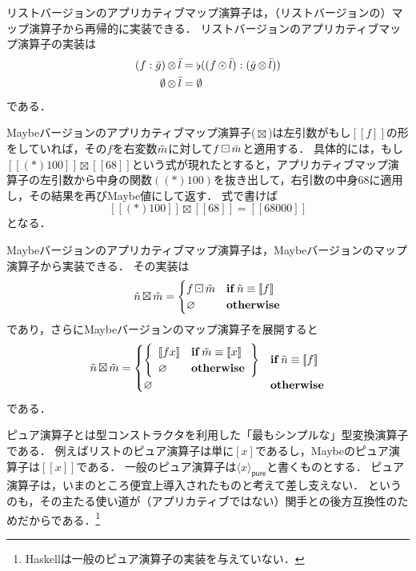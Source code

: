 \documentclass[twocolumn]{jsbook}
\def\[{[\![}
\def\]{]\!]}
\DeclareMathOperator{\hsklApplicativeListMap}{\otimes}
\DeclareMathOperator{\hsklApplicativeMaybeMap}{\boxtimes}
\DeclareMathOperator{\hsklConcat}{\flat}
\DeclareMathOperator{\hsklMap}{\odot}
\DeclareMathOperator{\hsklMaybeMap}{\boxdot}
\newcommand{\hsklEmptyList}{\emptyset}
\newcommand{\hsklNothing}{\varnothing}
\newcommand{\hsklJust}[1]{\[#1\]}
\newcommand{\hsklList}[1]{\Bar{#1}}
\newcommand{\hsklMaybe}[1]{\Tilde{#1}}
\newcommand{\hsklPure}[1]{\langle#1\rangle_\textsf{pure}}
\newcommand{\mathKeyword}[1]{\mathbf{#1}}
\DeclareMathOperator{\mathIf}{\mathKeyword{if}}
\newcommand{\mathOtherwise}{\mathKeyword{otherwise}}
\begin{document}
リストバージョンのアプリカティブマップ演算子は，（リストバージョンの）マップ演算子から再帰的に実装できる．
リストバージョンのアプリカティブマップ演算子の実装は
\begin{align*}
(f:\hsklList{g})\hsklApplicativeListMap\hsklList{l}&=\hsklConcat((f\hsklMap\hsklList{l}):(\hsklList{g}\hsklApplicativeListMap\hsklList{l}))\\
\hsklEmptyList\hsklApplicativeListMap\hsklList{l}&=\hsklEmptyList
\end{align*}
である．

Maybeバージョンのアプリカティブマップ演算子($\hsklApplicativeMaybeMap$)は左引数がもし$\hsklJust{f}$の形をしていれば，その$f$を右変数$\hsklMaybe{m}$に対して$f\hsklMaybeMap\hsklMaybe{m}$と適用する．
具体的には，もし$\hsklJust{(*)100}\hsklApplicativeMaybeMap{}\hsklJust{68}$という式が現れたとすると，アプリカティブマップ演算子の左引数から中身の関数$((*)100)$を抜き出して，右引数の中身$68$に適用し，その結果を再びMaybe値にして返す．
式で書けば
$$\hsklJust{(*)100}\hsklApplicativeMaybeMap{}\hsklJust{68}=\hsklJust{68000}$$
となる．

Maybeバージョンのアプリカティブマップ演算子は，Maybeバージョンのマップ演算子から実装できる．
その実装は
\begin{equation*}
\hsklMaybe{n}\hsklApplicativeMaybeMap\hsklMaybe{m}=\begin{cases}
f\hsklMaybeMap\hsklMaybe{m}&\mathIf\hsklMaybe{n}\equiv\hsklJust{f}\\
\hsklNothing&\mathOtherwise
\end{cases}
\end{equation*}
であり，さらにMaybeバージョンのマップ演算子を展開すると
\begin{equation*}
\hsklMaybe{n}\hsklApplicativeMaybeMap\hsklMaybe{m}=\begin{cases}
\left\{
\begin{array}{ll}
\hsklJust{fx}&\mathIf\hsklMaybe{m}\equiv\hsklJust{x}\\
\hsklNothing&\mathOtherwise
\end{array}\right\}&\mathIf\hsklMaybe{n}\equiv\hsklJust{f}\\
\hsklNothing&\mathOtherwise
\end{cases}
\end{equation*}
である．

ピュア演算子とは型コンストラクタを利用した「最もシンプルな」型変換演算子である．
例えばリストのピュア演算子は単に$[x]$であるし，Maybeのピュア演算子は$\hsklJust{x}$である．
一般のピュア演算子は$\hsklPure{x}$と書くものとする．
ピュア演算子は，いまのところ便宜上導入されたものと考えて差し支えない．
というのも，その主たる使い道が（アプリカティブではない）関手との後方互換性のためだからである．\footnote{Haskellは一般のピュア演算子の実装を与えていない．}
\end{document}
